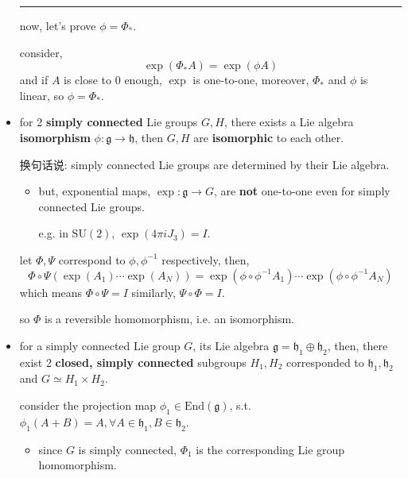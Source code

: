 \begin{itemize}
\begin{tcolorbox}[title=proof:]
		\noindent\rule[0.5ex]{\linewidth}{0.5pt} %
		
		now, let's prove $\phi = \Phi_*$.
		
		consider,
		\begin{equation}
			\exp(\Phi_* A) = \exp(\phi A)
		\end{equation}
		and if $A$ is close to $0$ enough, $\exp$ is one-to-one, moreover, $\Phi_*$ and $\phi$ is linear, so $\phi = \Phi_*$.
	\end{tcolorbox}
	
	\item for 2 \textbf{simply connected} Lie groups $G, H$, there exists a Lie algebra \textbf{isomorphism} $\phi : \mathfrak{g} \rightarrow \mathfrak{h}$, then $G, H$ are \textbf{isomorphic} to each other.
	
	换句话说: simply connected Lie groups are determined by their Lie algebra.
	\begin{itemize}
		\item but, exponential maps, $\exp : \mathfrak{g} \rightarrow G$, are \textbf{not} one-to-one even for simply connected Lie groups.
		
		e.g. in $\mathrm{SU}(2)$, $\exp(4 \pi i J_3) = I$.
	\end{itemize}
	
	\begin{tcolorbox}[title=proof:]
		let $\Phi, \Psi$ correspond to $\phi, \phi^{- 1}$ respectively, then,
		\begin{equation}
			\Phi \circ \Psi(\exp(A_1) \cdots \exp(A_N)) = \exp(\phi \circ \phi^{- 1} A_1) \cdots \exp(\phi \circ \phi^{- 1} A_N)
		\end{equation}
		which means $\Phi \circ \Psi = I$ similarly, $\Psi \circ \Phi = I$.
		
		so $\Phi$ is a reversible homomorphism, i.e. an isomorphism.
	\end{tcolorbox}
	
	\item for a simply connected Lie group $G$, its Lie algebra $\mathfrak{g} = \mathfrak{h}_1 \oplus \mathfrak{h}_2$, then, there exist 2 \textbf{closed, simply connected} subgroups $H_1, H_2$ corresponded to $\mathfrak{h}_1, \mathfrak{h}_2$ and $G \simeq H_1 \times H_2$.
	
	\begin{tcolorbox}[title=proof:]
		consider the projection map $\phi_1 \in \mathrm{End}(\mathfrak{g})$, s.t. $\phi_1(A + B) = A, \forall A \in \mathfrak{h}_1, B \in \mathfrak{h}_2$.
		\begin{itemize}
			\item since $G$ is simply connected, $\Phi_1$ is the corresponding Lie group homomorphism.
			

\end{itemize}
\end{tcolorbox}
\end{itemize}
